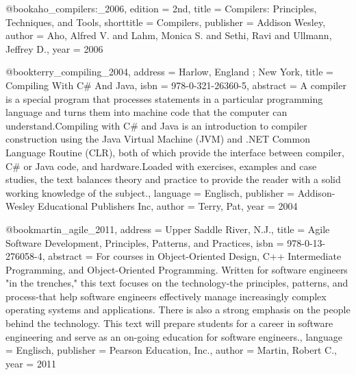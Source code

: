 @book{aho_compilers:_2006,
	edition = {2nd},
	title = {Compilers: {Principles}, {Techniques}, and {Tools}},
	shorttitle = {Compilers},
	publisher = {Addison Wesley},
	author = {Aho, Alfred V. and Lahm, Monica S. and Sethi, Ravi and Ullmann, Jeffrey D.},
	year = {2006}
}

@book{terry_compiling_2004,
	address = {Harlow, England ; New York},
	title = {Compiling {With} {C}\# {And} {Java}},
	isbn = {978-0-321-26360-5},
	abstract = {A compiler is a special program that processes statements in a particular programming language and turns them into machine code that the computer can understand.Compiling with C\# and Java is an introduction to compiler construction using the Java Virtual Machine (JVM) and .NET Common Language Routine (CLR), both of which provide the interface between compiler, C\# or Java code, and hardware.Loaded with exercises, examples and case studies, the text balances theory and practice to provide the reader with a solid working knowledge of the subject.},
	language = {Englisch},
	publisher = {Addison-Wesley Educational Publishers Inc},
	author = {Terry, Pat},
	year = {2004}
}

@book{martin_agile_2011,
	address = {Upper Saddle River, N.J.},
	title = {Agile {Software} {Development}, {Principles}, {Patterns}, and {Practices}},
	isbn = {978-0-13-276058-4},
	abstract = {For courses in Object-Oriented Design, C++ Intermediate Programming, and Object-Oriented Programming.  Written for software engineers "in the trenches," this text focuses on the technology-the principles, patterns, and process-that help software engineers effectively manage increasingly complex operating systems and applications. There is also a strong emphasis on the people behind the technology. This text will prepare students for a career in software engineering and serve as an on-going education for software engineers.},
	language = {Englisch},
	publisher = {Pearson Education, Inc.},
	author = {Martin, Robert C.},
	year = {2011}
}

